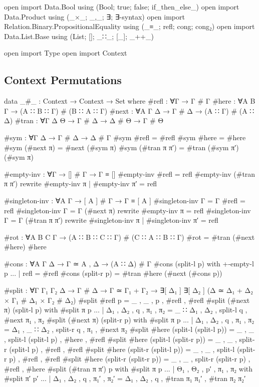 \begin{code}[hide]
open import Data.Bool using (Bool; true; false; if_then_else_)
open import Data.Product using (_×_; _,_; ∃; ∃-syntax)
open import Relation.Binary.PropositionalEquality using (_≡_; refl; cong; cong₂)
open import Data.List.Base using (List; []; _∷_; [_]; _++_)

open import Type
open import Context
\end{code}

\subsection{Context Permutations}
\label{sec:permutations-agda}

\begin{code}
data _#_ : Context → Context → Set where
  #refl  : ∀{Γ} → Γ # Γ
  #here  : ∀{A B Γ} → (A ∷ B ∷ Γ) # (B ∷ A ∷ Γ)
  #next  : ∀{A Γ Δ} → Γ # Δ → (A ∷ Γ) # (A ∷ Δ)
  #tran  : ∀{Γ Δ Θ} → Γ # Δ → Δ # Θ → Γ # Θ

#sym : ∀{Γ Δ} → Γ # Δ → Δ # Γ
#sym #refl = #refl
#sym #here = #here
#sym (#next π) = #next (#sym π)
#sym (#tran π π′) = #tran (#sym π′) (#sym π)

#empty-inv : ∀{Γ} → [] # Γ → Γ ≡ []
#empty-inv #refl = refl
#empty-inv (#tran π π′) rewrite #empty-inv π | #empty-inv π′ = refl

#singleton-inv : ∀{A Γ} → [ A ] # Γ → Γ ≡ [ A ]
#singleton-inv {Γ = Γ} #refl = refl
#singleton-inv {Γ = Γ} (#next π) rewrite #empty-inv π = refl
#singleton-inv {Γ = Γ} (#tran π π′) rewrite #singleton-inv π | #singleton-inv π′ = refl

#rot : ∀{A B C Γ} → (A ∷ B ∷ C ∷ Γ) # (C ∷ A ∷ B ∷ Γ)
#rot = #tran (#next #here) #here

#cons : ∀{A Γ Δ} → Γ ≃ A , Δ → (A ∷ Δ) # Γ
#cons (split-l p) with +-empty-l p
... | refl = #refl
#cons (split-r p) = #tran #here (#next (#cons p))

#split : ∀{Γ Γ₁ Γ₂ Δ} → Γ # Δ → Γ ≃ Γ₁ + Γ₂ → ∃[ Δ₁ ] ∃[ Δ₂ ] (Δ ≃ Δ₁ + Δ₂ × Γ₁ # Δ₁ × Γ₂ # Δ₂)
#split #refl p = _ , _ , p , #refl , #refl
#split (#next π) (split-l p) with #split π p
... | Δ₁ , Δ₂ , q , π₁ , π₂ = _ ∷ Δ₁ , Δ₂ , split-l q , #next π₁ , π₂
#split (#next π) (split-r p) with #split π p
... | Δ₁ , Δ₂ , q , π₁ , π₂ = Δ₁ , _ ∷ Δ₂ , split-r q , π₁ , #next π₂
#split #here (split-l (split-l p)) = _ , _ , split-l (split-l p) , #here , #refl
#split #here (split-l (split-r p)) = _ , _ , split-r (split-l p) , #refl , #refl
#split #here (split-r (split-l p)) = _ , _ , split-l (split-r p) , #refl , #refl
#split #here (split-r (split-r p)) = _ , _ , split-r (split-r p) , #refl , #here
#split (#tran π π′) p with #split π p
... | Θ₁ , Θ₂ , p′ , π₁ , π₂ with #split π′ p′
... | Δ₁ , Δ₂ , q , π₁′ , π₂′ = Δ₁ , Δ₂ , q , #tran π₁ π₁′ , #tran π₂ π₂′


\end{code}
